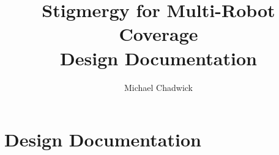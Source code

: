\documentclass[oneside,openany,a4paper,12pt]{book}
\title{Stigmergy for Multi-Robot Coverage \\Design Documentation}
\author{Michael Chadwick}
\begin{document}
\maketitle
\tableofcontents

\chapter{Design Documentation}

%


%


%
%
%
%
%
%
%
%
\printbibliography
\end{document}
